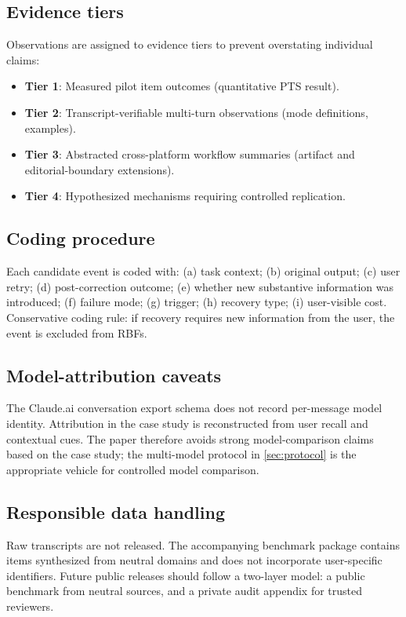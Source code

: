 \documentclass[11pt]{article}
\begin{document}
\subsection{Evidence tiers}
Observations are assigned to evidence tiers to prevent overstating individual claims:
\begin{itemize}[leftmargin=*]
  \item \textbf{Tier 1}: Measured pilot item outcomes (quantitative PTS result).
  \item \textbf{Tier 2}: Transcript-verifiable multi-turn observations (mode definitions, examples).
  \item \textbf{Tier 3}: Abstracted cross-platform workflow summaries (artifact and editorial-boundary extensions).
  \item \textbf{Tier 4}: Hypothesized mechanisms requiring controlled replication.
\end{itemize}

\subsection{Coding procedure}
Each candidate event is coded with: (a) task context; (b) original output; (c) user retry; (d) post-correction outcome; (e) whether new substantive information was introduced; (f) failure mode; (g) trigger; (h) recovery type; (i) user-visible cost. Conservative coding rule: if recovery requires new information from the user, the event is excluded from RBFs.

\subsection{Model-attribution caveats}
The Claude.ai conversation export schema does not record per-message model identity. Attribution in the case study is reconstructed from user recall and contextual cues. The paper therefore avoids strong model-comparison claims based on the case study; the multi-model protocol in \cref{sec:protocol} is the appropriate vehicle for controlled model comparison.

\subsection{Responsible data handling}
Raw transcripts are not released. The accompanying benchmark package contains items synthesized from neutral domains and does not incorporate user-specific identifiers. Future public releases should follow a two-layer model: a public benchmark from neutral sources, and a private audit appendix for trusted reviewers.
\end{document}

